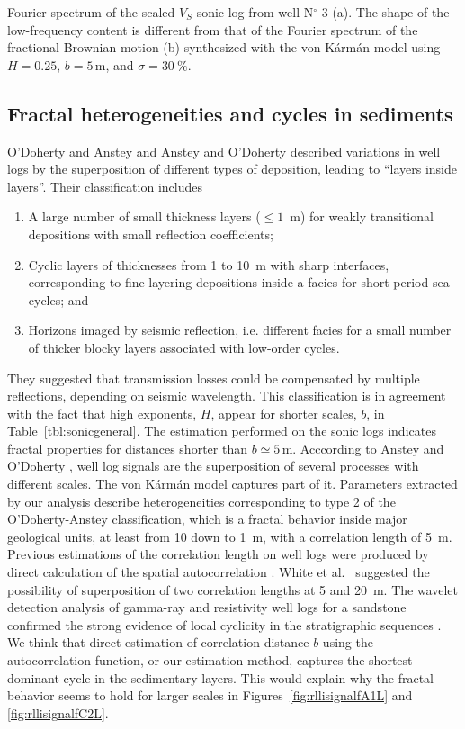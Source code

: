 {Fourier spectrum of the scaled $V_S$ sonic log from well N$^{\circ}$ 3 (a). The shape of the low-frequency 
content is different from that of the Fourier spectrum of the fractional Brownian motion (b)
synthesized with the von K\'arm\'an model using $H=0.25$, $b=5$\,m, and $\sigma=30~\%$.}

\subsection{Fractal heterogeneities and cycles in sediments}


O'Doherty and Anstey  and Anstey and O'Doherty  
described variations in well logs by the superposition of 
different types of deposition, leading to ``layers inside layers''. 
Their classification includes
\begin{enumerate}
\renewcommand{\theenumi}{\arabic{enumi}}
\item A large number of small thickness layers ($\leq 1$~m)
for weakly transitional depositions with small reflection coefficients;
\item Cyclic layers of thicknesses from 1 to 10~m with sharp interfaces,
corresponding to fine layering depositions inside a facies
for short-period sea cycles; and
\item Horizons imaged by seismic reflection, i.e. different facies for a small number of thicker blocky layers associated with low-order cycles.
\end{enumerate}
They suggested that transmission losses could be compensated by multiple reflections, depending on seismic wavelength.
This classification is in agreement with the fact that high exponents, $H$, appear for shorter scales, $b$, in Table~\ref{tbl:sonicgeneral}.
The estimation performed on the sonic logs
indicates fractal properties for distances shorter than $b\simeq 5$\,m.
Acccording to Anstey and O'Doherty ,
well log signals are the superposition of several processes with different scales.
The von K\'arm\'an model captures part of it.
Parameters extracted by our analysis describe heterogeneities
corresponding to type 2 of the O'Doherty-Anstey classification,
which is a fractal behavior inside major geological units, at least from 10 down to 1~m,
with a correlation length of 5~m.
Previous estimations of the correlation length on well logs
were produced by direct calculation of the spatial autocorrelation \cite[]{White_SN90,Shiomi_SO97}.
White et al.~ suggested the possibility of superposition of two correlation lengths at 5 and 20~m.
The wavelet detection analysis of gamma-ray and resistivity well logs
for a sandstone confirmed the strong evidence of local cyclicity in the stratigraphic sequences \cite[]{Rivera_RJCA04}.
We think that direct estimation of correlation distance $b$ using the autocorrelation function, or our estimation method,
captures the shortest dominant cycle in the sedimentary layers.
This would explain why the fractal behavior seems to hold for larger scales 
in Figures~\ref{fig:rllisignalfA1L} and \ref{fig:rllisignalfC2L}.

